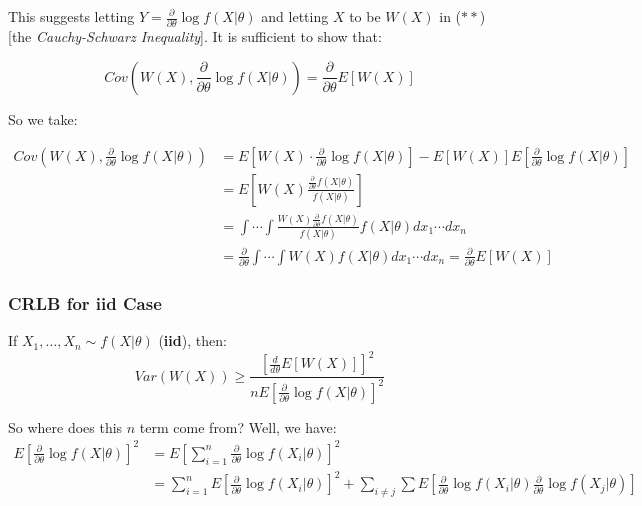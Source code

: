 \documentclass{article}
\begin{document}
This suggests letting $Y= \frac{\partial}{\partial\theta}\log f(X|\theta)$ and letting $X$ to be $W(X)$ in ($**$) [the \textit{Cauchy-Schwarz Inequality}]. It is sufficient to show that:

\begin{equation*}
    Cov\left(W(X), \frac{\partial}{\partial \theta}\log f(X|\theta) \right) = \frac{\partial}{\partial \theta} E[W(X)]
\end{equation*}

So we take:

\begin{equation*}
    \begin{split}
        Cov\left(W(X), \frac{\partial}{\partial \theta}\log f(X|\theta) \right) &= E \left[W(X)\cdot \frac{\partial}{\partial \theta}\log f(X|\theta) \right] - E[W(X)]E\left[\frac{\partial}{\partial \theta} \log f(X|\theta) \right]\\
        &= E\left[W(X) \frac{\frac{\partial}{\partial \theta} f(X|\theta)}{f(X|\theta)} \right]\\
        &= \int\cdots \int \frac{W(X)\frac{\partial}{\partial \theta}f(X|\theta)}{f(X|\theta)}f(X|\theta) dx_1\cdots dx_n\\
        &= \frac{\partial}{\partial\theta}\int \cdots \int W(X) f(X|\theta) dx_1\cdots dx_n = \frac{\partial}{\partial \theta}E[W(X)]
    \end{split}
\end{equation*}

\subsubsection{CRLB for iid Case}

If $X_1,\dots,X_n\sim f(X|\theta)$ (\textbf{iid}), then:
\begin{equation*}
    Var(W(X)) \geq \frac{\left[\frac{d}{d\theta} E[W(X)] \right]^2}{nE\left[\frac{\partial}{\partial \theta} \log f(X|\theta) \right]^2}
\end{equation*}


So where does this $n$ term come from? Well, we have:
\begin{equation*}
    \begin{split}
        E\left[\frac{\partial}{\partial \theta} \log f(X|\theta) \right]^2 &= E \left[\sum_{i=1}^n \frac{\partial}{\partial \theta} \log f(X_i|\theta) \right]^2\\
        &= \sum_{i=1}^n E\left[\frac{\partial}{\partial\theta} \log f(X_i|\theta) \right]^2 + \sum_{i\neq j}\sum E\left[\frac{\partial}{\partial \theta} \log f(X_i|\theta) \frac{\partial}{\partial \theta} \log f(X_j|\theta) \right]\\
    \end{split}
\end{equation*}
\end{document}
